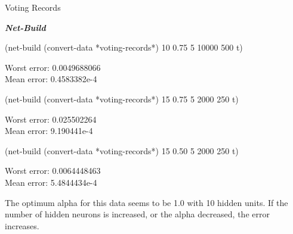 \documentclass{article}
\begin{document}
 \begin{flushleft}
 \begin{Large}
Voting Records\\
 \end{Large}
 \end{flushleft}
 
\textbf{\emph{Net-Build}\\}

  \begin{small}
(net-build (convert-data *voting-records*) 10 0.75 5 10000 500 t)
  \end{small}
  
  \begin{normalsize}
  
  \begin{flushleft}
  Worst error: 0.0049688066\\
  Mean error: 0.4583382e-4 \\
  \end{flushleft}
  
  \end{normalsize}
  
    \begin{small}
(net-build (convert-data *voting-records*) 15 0.75 5 2000 250 t)
  \end{small}
  \begin{normalsize}
  
 \begin{flushleft}
  Worst error: 0.025502264\\
  Mean error: 9.190441e-4 \\
 \end{flushleft}
  
  \end{normalsize}
  
    \begin{small}
(net-build (convert-data *voting-records*) 15 0.50 5 2000 250 t)
  \end{small}
  \begin{normalsize}
  
 \begin{flushleft}
  Worst error: 0.0064448463\\
  Mean error: 5.4844434e-4 
 \end{flushleft}
  
  \end{normalsize}
  
\begin{normalsize}
The optimum alpha for this data seems to be 1.0 with 10 hidden units. If the number of hidden neurons is increased, or the alpha decreased, the error increases.\\
\end{normalsize}
  
\end{document}
